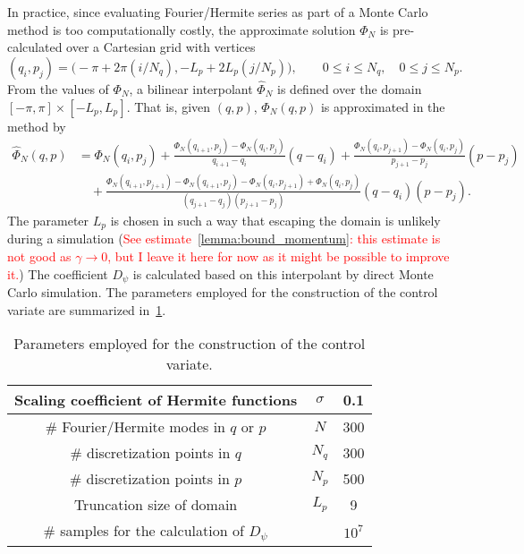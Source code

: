 \documentclass[11pt,a4paper]{article}
\theoremstyle{plain}
\numberwithin{equation}{section}
\renewcommand{\leq}{\leqslant}
\begin{document}
In practice, since evaluating Fourier/Hermite series as part of a Monte Carlo method is too computationally costly,
the approximate solution $\Phi_N$ is pre-calculated over a Cartesian grid with vertices
\[
    (q_i, p_j) = \bigl(- \pi + 2\pi(i/N_q) , - L_p + 2L_p (j/N_p) \bigr), \qquad 0 \leq i \leq N_q, \quad 0 \leq j \leq N_p.
\]
From the values of $\Phi_N$,
a bilinear interpolant $\widehat \Phi_N$ is defined over the domain $[-\pi, \pi] \times [-L_p, L_p]$.
That is, given $(q, p)$, $\Phi_N(q, p)$ is approximated in the method by
\begin{align*}
    \widehat \Phi_N(q, p)
    &= \Phi_N(q_i,p_j) + \frac{\Phi_N(q_{i+1}, p_j) - \Phi_N(q_i, p_j)}{q_{i+1} - q_i} (q - q_i)
    +\frac{\Phi_N(q_{i}, p_{j+1}) - \Phi_N(q_{i}, p_{j})}{p_{j+1} - p_j} (p - p_j) \\
    &\quad + \frac{\Phi_N(q_{i+1}, p_{j+1}) - \Phi_N(q_{i+1}, p_{j}) - \Phi_N(q_{i}, p_{j+1}) + \Phi_N(q_{i}, p_{j})}{(q_{j+1} - q_j)(p_{j+1} - p_j)}  (q-q_i)(p-p_j).
\end{align*}
The parameter $L_p$ is chosen in such a way that escaping the domain is unlikely during a simulation
(\textcolor{red}{See estimate~\cref{lemma:bound_momentum}: this estimate is not good as $\gamma \to 0$,
but I leave it here for now as it might be possible to improve it.})
The coefficient $D_\psi$ is calculated based on this interpolant by direct Monte Carlo simulation.
The parameters employed for the construction of the control variate are summarized in~\cref{table:parameters_employed_for_the_construction_of_the_control_variate}.

\begin{table}[ht]
    \centering
    \begin{tabular}{|c|c|c|}
        \hline
        Scaling coefficient of Hermite functions & $\sigma$ & 0.1 \\
        \hline
        \# Fourier/Hermite modes in $q$ or $p$ & $N$ & 300 \\
        \hline
        \# discretization points in $q$ & $N_q$ & 300 \\
        \hline
        \# discretization points in $p$ & $N_p$ & 500 \\
        \hline
        Truncation size of domain & $L_p$ & 9 \\
        \hline
        \# samples for the calculation of $D_{\psi}$ & & $10^7$ \\
        \hline
    \end{tabular}
    \caption{Parameters employed for the construction of the control variate.}
    \label{table:parameters_employed_for_the_construction_of_the_control_variate}
\end{table}
\end{document}

